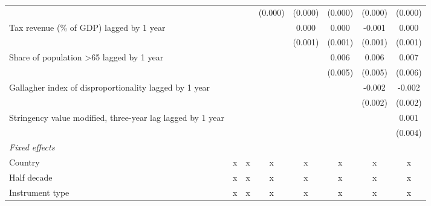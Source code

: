 \begin{tabular}{lccccccc}
                                                                                                       &         &              & (0.000) & (0.000)       & (0.000) & (0.000) & (0.000)\\   
   Tax revenue (\% of GDP) lagged by 1 year                                                            &         &              &         & 0.000         & 0.000   & -0.001  & 0.000\\   
                                                                                                       &         &              &         & (0.001)       & (0.001) & (0.001) & (0.001)\\   
   Share of population >65 lagged by 1 year                                                            &         &              &         &               & 0.006   & 0.006   & 0.007\\   
                                                                                                       &         &              &         &               & (0.005) & (0.005) & (0.006)\\   
   Gallagher index of disproportionality lagged by 1 year                                              &         &              &         &               &         & -0.002  & -0.002\\   
                                                                                                       &         &              &         &               &         & (0.002) & (0.002)\\   
   Stringency value modified, three-year lag lagged by 1 year                                          &         &              &         &               &         &         & 0.001\\   
                                                                                                       &         &              &         &               &         &         & (0.004)\\   
   \emph{Fixed effects}\\
   Country                                                                                             & x       & x            & x       & x             & x       & x       & x\\  
   Half decade                                                                                         & x       & x            & x       & x             & x       & x       & x\\  
   Instrument type                                                                                     & x       & x            & x       & x             & x       & x       & x\\  

\end{tabular}
